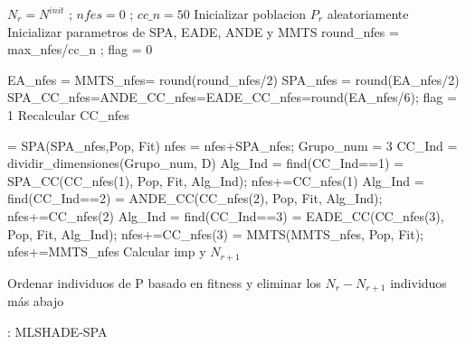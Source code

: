 \begin{algorithm}[h]
	\begin{algorithmic}[1]
		\STATE $N_r = N^{init}$ ; $nfes = 0$ ; $cc\_n = 50$
		\STATE Inicializar poblacion $P_r$ aleatoriamente
		\STATE Inicializar parametros de SPA, EADE, ANDE y MMTS
		\STATE round\_nfes = max\_nfes/cc\_n ; flag = 0
		
			\STATE EA\_nfes = MMTS\_nfes=  round(round\_nfes/2)
			\STATE SPA\_nfes = round(EA\_nfes/2)
				\STATE SPA\_CC\_nfes=ANDE\_CC\_nfes=EADE\_CC\_nfes=round(EA\_nfes/6); flag = 1
			\ELSE 
				\STATE Recalcular CC\_nfes
			\ENDIF	
			
			 = SPA(SPA\_nfes,Pop, Fit)
			\STATE nfes = nfes+SPA\_nfes; Grupo\_num = 3
			\STATE CC\_Ind = dividir\_dimensiones(Grupo\_num, D)
			\STATE Alg\_Ind = find(CC\_Ind==1)
			 = SPA\_CC(CC\_nfes(1), Pop, Fit, Alg\_Ind); nfes+=CC\_nfes(1)
			\STATE Alg\_Ind = find(CC\_Ind==2)
			 = ANDE\_CC(CC\_nfes(2), Pop, Fit, Alg\_Ind); nfes+=CC\_nfes(2)
			\STATE Alg\_Ind = find(CC\_Ind==3)
			 = EADE\_CC(CC\_nfes(3), Pop, Fit, Alg\_Ind); nfes+=CC\_nfes(3)	
			 = MMTS(MMTS\_nfes, Pop, Fit); nfes+=MMTS\_nfes
			\STATE Calcular imp y $N_{r+1}$
			
				\STATE 	Ordenar individuos de P basado en fitness y eliminar los $N_r - N_{r+1}$ individuos más abajo
			\ENDIF
		
		\ENDWHILE
		
	\end{algorithmic}
	\caption{: MLSHADE-SPA} \label{Alg: MLSHADE-SPA}
\end{algorithm}

